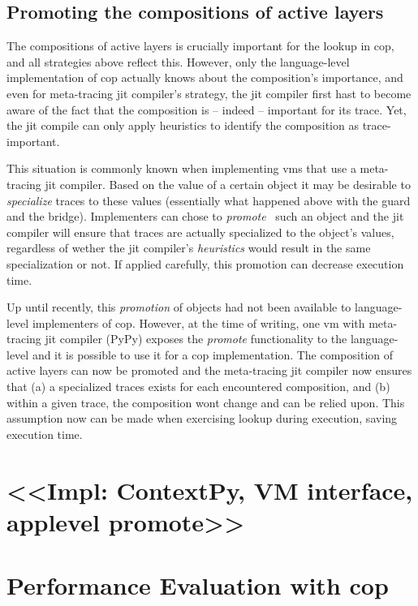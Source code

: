 \documentclass[preprint,english,10pt,nonatbib]{sigplanconf}
\begin{document}
\subsection{Promoting the compositions of active layers}

The compositions of active layers is crucially important for the lookup in
\ac{cop}, and all strategies above reflect this. However, only the
language-level implementation of \ac{cop} actually knows about the
composition's importance, and even for meta-tracing \ac{jit} compiler's
strategy, the \ac{jit} compiler first hast to become aware of the fact that the
composition is \--- indeed \--- important for its trace. Yet, the \ac{jit}
compile can only apply heuristics to identify the composition as
trace-important.

This situation is commonly known when implementing \acp{vm} that use a
meta-tracing \ac{jit} compiler. Based on the value of a certain object it may
be desirable to \emph{specialize} traces to these values (essentially what
happened above with the guard and the bridge).
Implementers can chose to \emph{promote}~\cite[\S
3.1]{bolz+:2011:runtime-feedback} such an object and the \ac{jit} compiler will
ensure that traces are actually specialized to the object's values,  regardless
of wether the \ac{jit} compiler's \emph{heuristics} would result in the same
specialization or not. If applied carefully, this promotion can decrease
execution time.

Up until recently, this \emph{promotion} of objects had not been available to
language-level implementers of \ac{cop}. However, at the time of writing, one
\ac{vm} with meta-tracing \ac{jit} compiler (PyPy) exposes the \emph{promote}
functionality to the language-level and it is possible to use it for a \ac{cop}
implementation. The composition of active layers can now be promoted and the
meta-tracing \ac{jit} compiler now ensures that (a) a specialized traces exists
for each encountered composition, and (b) within a given trace, the composition
wont change and can be relied upon. This assumption now can be made when
exercising lookup during execution, saving execution time.


\section{<<Impl: ContextPy, VM interface, applevel promote>>}


\section{Performance Evaluation with \acs{cop}}
\end{document}
